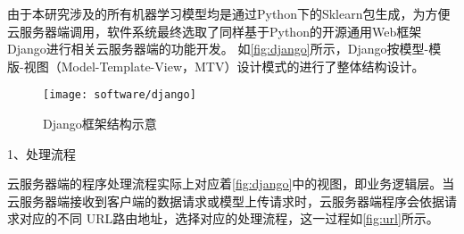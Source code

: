 由于本研究涉及的所有机器学习模型均是通过Python下的Sklearn包生成，为方便云服务器端调用，软件系统最终选取了同样基于Python的开源通用Web框架Django进行相关云服务器端的功能开发。
如\autoref{fig:django}所示\cite{django,djangosq}，Django按模型-模版-视图（Model-Template-View，MTV）设计模式的进行了整体结构设计。
\begin{figure}[htbp]
    \centering
    \texttt{[image: software/django]}
    \caption{\label{fig:django}Django框架结构示意\cite{djangosq}}
\end{figure}

1、处理流程

云服务器端的程序处理流程实际上对应着\autoref{fig:django}中的视图，即业务逻辑层。当云服务器端接收到客户端的数据请求或模型上传请求时，云服务器端程序会依据请求对应的不同
URL路由地址，选择对应的处理流程，这一过程如\autoref{fig:url}所示。

